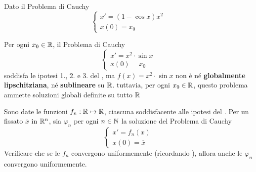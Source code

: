 \begin{example}
	Dato il Problema di Cauchy
	$$\begin{cases}
		x' = (1-\cos x) x^2\\
		x(0) = x_0
	\end{cases}$$
\end{example}
\begin{example}
	Per ogni $x_0 \in \mathbb{R}$, il Problema di Cauchy
	\begin{equation*}
		\begin{cases}
			x' = x^2 \cdot \sin x\\
			x(0) = x_0
		\end{cases}
	\end{equation*}
	soddisfa le ipotesi 1., 2. e 3. del , ma $f(x) = x^2 \cdot \sin x$ non è né \textbf{globalmente lipschitziana}, né \textbf{sublineare} su $\mathbb{R}$. tuttavia, per ogni $x_0 \in \mathbb{R}$, questo problema ammette soluzioni globali definite su tutto $\mathbb{R}$
\end{example}
\begin{exercise}
	Sono date le funzioni $f_n:\mathbb{R} \mapsto \mathbb{R}$, ciascuna soddisfacente alle ipotesi del . Per un fissato $\overline{x}$ in $\mathbb{R}^n$, sia $\varphi_n$ per ogni $n \in \mathbb{N}$ la soluzione del Problema di Cauchy
	\begin{equation*}
		\begin{cases}
			x' = f_n(x)\\
			x(0) = \overline{x}
		\end{cases}
	\end{equation*}
	Verificare che se le $f_n$ convergono uniformemente (ricordando ), allora anche le $\varphi_n$ convergono uniformemente.
\end{exercise}


